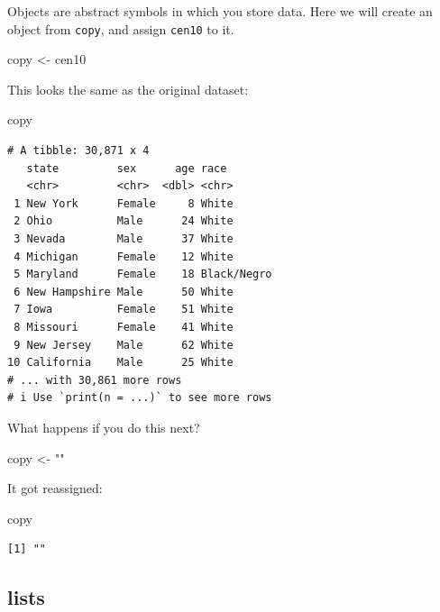 \documentclass[
  letterpaper,
]{book}
\newenvironment{Shaded}{\begin{snugshade}}{\end{snugshade}}
\newcommand{\NormalTok}[1]{\textcolor[rgb]{0.00,0.23,0.31}{#1}}
\newcommand{\OtherTok}[1]{\textcolor[rgb]{0.00,0.23,0.31}{#1}}
\newcommand{\StringTok}[1]{\textcolor[rgb]{0.13,0.47,0.30}{#1}}
\theoremstyle{definition}
\theoremstyle{definition}
\theoremstyle{plain}
\theoremstyle{definition}
\theoremstyle{plain}
\theoremstyle{plain}
\theoremstyle{remark}
\begin{document}
Objects are abstract symbols in which you store data. Here we will
create an object from \texttt{copy}, and assign \texttt{cen10} to it.

\begin{Shaded}
\begin{Highlighting}[]
\NormalTok{copy }\OtherTok{\textless{}{-}}\NormalTok{ cen10 }
\end{Highlighting}
\end{Shaded}

This looks the same as the original dataset:

\begin{Shaded}
\begin{Highlighting}[]
\NormalTok{copy}
\end{Highlighting}
\end{Shaded}

\begin{verbatim}
# A tibble: 30,871 x 4
   state         sex      age race       
   <chr>         <chr>  <dbl> <chr>      
 1 New York      Female     8 White      
 2 Ohio          Male      24 White      
 3 Nevada        Male      37 White      
 4 Michigan      Female    12 White      
 5 Maryland      Female    18 Black/Negro
 6 New Hampshire Male      50 White      
 7 Iowa          Female    51 White      
 8 Missouri      Female    41 White      
 9 New Jersey    Male      62 White      
10 California    Male      25 White      
# ... with 30,861 more rows
# i Use `print(n = ...)` to see more rows
\end{verbatim}

What happens if you do this next?

\begin{Shaded}
\begin{Highlighting}[]
\NormalTok{copy }\OtherTok{\textless{}{-}} \StringTok{""}
\end{Highlighting}
\end{Shaded}

It got reassigned:

\begin{Shaded}
\begin{Highlighting}[]
\NormalTok{copy}
\end{Highlighting}
\end{Shaded}

\begin{verbatim}
[1] ""
\end{verbatim}

\hypertarget{lists}{%
\subsection{lists}\label{lists}}
\end{document}

